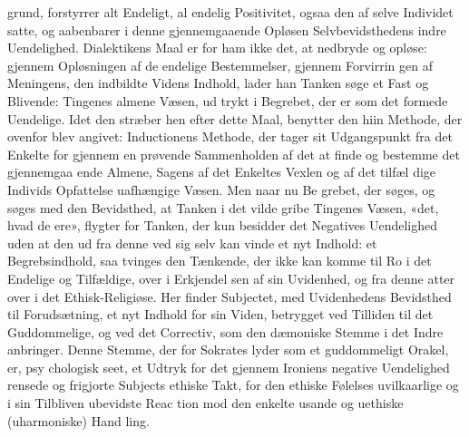 \documentclass[12pt,a4paper]{book}
\begin{document}
grund, forstyrrer alt Endeligt, al endelig Positivitet, ogsaa den
af selve Individet satte, og aabenbarer i denne gjennemgaaende
Opløsen Selvbevidsthedens indre Uendelighed. Dialektikens
Maal er for ham ikke det, at nedbryde og opløse: gjennem
Opløsningen af de endelige Bestemmelser, gjennem Forvirrin\-%
gen af Meningens, den indbildte Videns Indhold, lader han
Tanken søge et Fast og Blivende: Tingenes almene Væsen, ud\-%
trykt i Begrebet, der er som det formede Uendelige. Idet
den stræber hen efter dette Maal, benytter den hiin Methode,
der ovenfor blev angivet: Inductionens Methode, der tager
sit Udgangspunkt fra det Enkelte for gjennem en prøvende
Sammenholden af det at finde og bestemme det gjennemgaa\-%
ende Almene, Sagens af det Enkeltes Vexlen og af det tilfæl\-%
dige Individs Opfattelse uafhængige Væsen. Men naar nu Be\-%
grebet, der søges, og søges med den Bevidsthed, at Tanken i
det vilde gribe Tingenes Væsen, «det, hvad de ere», flygter
for Tanken, der kun besidder det Negatives Uendelighed uden
at den ud fra denne ved sig selv kan vinde et nyt Indhold:
et Begrebsindhold, saa tvinges den Tænkende, der ikke kan
komme til Ro i det Endelige og Tilfældige, over i Erkjendel\-%
sen af sin Uvidenhed, og fra denne atter over i det Ethisk-Religiøse.
Her finder Subjectet, med Uvidenhedens Bevidsthed
til Forudsætning, et nyt Indhold for sin Viden, betrygget ved
Tilliden til det Guddommelige, og ved det Correctiv, som den
dæmoniske Stemme i det Indre anbringer. Denne Stemme,
der for Sokrates lyder som et guddommeligt Orakel, er, psy\-%
chologisk seet, et Udtryk for det gjennem Ironiens negative
Uendelighed rensede og frigjorte Subjects ethiske Takt, for den
ethiske Følelses uvilkaarlige og i sin Tilbliven ubevidste Reac\-%
tion mod den enkelte usande og uethiske (uharmoniske) Hand\-%
ling.
\end{document}
